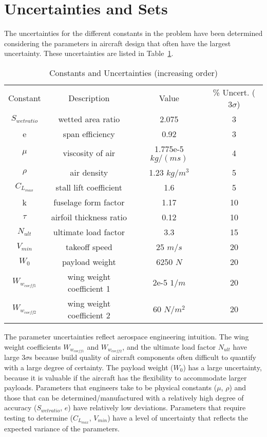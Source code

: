 \section{Uncertainties and Sets}

The uncertainties for the different constants in the problem have been determined considering the parameters in aircraft design that often have the largest uncertainty. These uncertainties are listed in Table~\ref{tab:uncertainties}.

\begin{table}
\begin{center}
\caption{\label{tab:uncertainties} Constants and Uncertainties (increasing order)}
\begin{tabular}{c c c c}
\hline
Constant & Description & Value & \% Uncert. ($3\sigma$) \\
$S_{wetratio}$ & wetted area ratio & 2.075 & 3\\
e & span efficiency & 0.92 & 3\\
$\mu$ & viscosity of air & 1.775e-5 $kg/(ms)$ & 4 \\
$\rho$ & air density & 1.23 $kg/m^3$ & 5 \\
$C_{L_{max}}$ & stall lift coefficient & 1.6 & 5\\
k & fuselage form factor & 1.17 & 10\\
$\tau$ & airfoil thickness ratio & 0.12 & 10\\
$N_{ult}$ & ultimate load factor & 3.3 & 15\\
$V_{min}$ & takeoff speed & 25 $m/s$ & 20\\
$W_0$ & payload weight & 6250 $N$ & 20\\
$W_{w_{coeff1}}$ & wing weight coefficient 1 & 2e-5 $1/m$ & 20\\
$W_{w_{coeff2}}$ & wing weight coefficient 2 & 60 $N/m^2$ & 20\\
\hline
\end{tabular}
\end{center}
\end{table}

The parameter uncertainties reflect aerospace engineering intuition. The wing weight coefficients $W_{w_{coeff1}}$ and $W_{w_{coeff2}}$, and the ultimate load factor $N_{ult}$ have large $3\sigma$s because build quality of aircraft components often difficult to quantify with a large degree of certainty. The payload weight ($W_0$) has a large uncertainty, because it is valuable if the aircraft has the flexibility to accommodate larger payloads. Parameters that engineers take to be physical constants ($\mu$, $\rho$) and those that can be determined/manufactured with a relatively high degree of accuracy ($S_{wetratio}$, $e$) have relatively low deviations. Parameters that require testing to determine ($C_{L_{max}}$, $V_{min}$) have a level of uncertainty that reflects the expected variance of the parameters. 